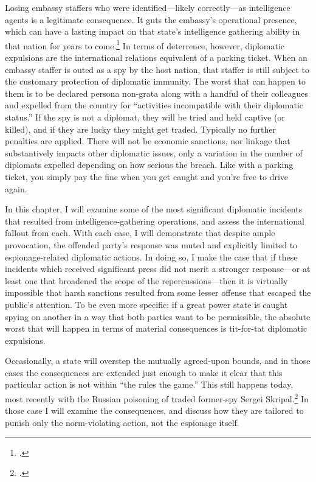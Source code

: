 \documentclass[12pt]{article}
\begin{document}
Losing embassy staffers who were identified---likely correctly---as intelligence agents is a legitimate consequence. It guts the embassy's operational presence, which can have a lasting impact on that state's intelligence gathering ability in that nation for years to come.\footcite{macintyre_spy_2018} In terms of deterrence, however, diplomatic expulsions are the international relations equivalent of a parking ticket. When an embassy staffer is outed as a spy by the host nation, that staffer is still subject to the customary protection of diplomatic immunity. The worst that can happen to them is to be declared persona non-grata along with a handful of their colleagues and expelled from the country for ``activities incompatible with their diplomatic status.'' If the spy is not a diplomat, they will be tried and held captive (or killed), and if they are lucky they might get traded. Typically no further penalties are applied. There will not be economic sanctions, nor linkage that substantively impacts other diplomatic issues, only a variation in the number of diplomats expelled depending on how serious the breach.  Like with a parking ticket, you simply pay the fine when you get caught and you're free to drive again.

In this chapter, I will examine some of the most significant diplomatic incidents that resulted from intelligence-gathering operations, and assess the international fallout from each. With each case, I will demonstrate that despite ample provocation, the offended party's response was muted and explicitly limited to espionage-related diplomatic actions. In doing so, I make the case that if these incidents which received significant press did not merit a stronger response---or at least one that broadened the scope of the repercussions---then it is virtually impossible that harsh sanctions resulted from some lesser offense that escaped the public's attention. To be even more specific: if a great power state is caught spying on another in a way that both parties want to be permissible, the absolute worst that will happen in terms of material consequences is tit-for-tat diplomatic expulsions.

Occasionally, a state will overstep the mutually agreed-upon bounds, and in those cases the consequences are extended just enough to make it clear that this particular action is not within ``the rules the game.'' This still happens today, most recently with the Russian poisoning of traded former-spy Sergei Skripal.\footcite{masters_has_2018} In those case I will examine the consequences, and discuss how they are tailored to punish only the norm-violating action, not the espionage itself.
\end{document}
